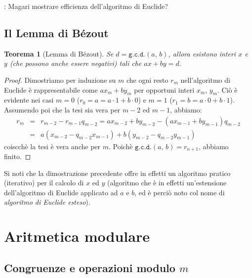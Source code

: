 \documentclass[pdflatex,11pt,a4paper,oneside]{article}
\newcommand{\XXX}[1][XXX]{\text{\bfseries{\color{red}{\emph{#1}}}}}
\newcommand{\TODO}[0]{\XXX[TODO]}
\newcommand{\p}[1]{\left({#1}\right)}
\newcommand{\gcdop}[0]{\ensuremath{\mathtt{g.c.d.}}}
\newcommand{\xgcd}[1]{\ensuremath{\gcdop\left({#1}\right)}}
\renewcommand{\gcd}[2]{\xgcd{{#1},\,{#2}}}
\newtheorem{theorem}[TheoremLike]{Teorema}
\begin{document}
\noindent
\TODO: Magari mostrare efficienza dell'algoritmo di Euclide?


\subsection{Il Lemma di B\'ezout}

\begin{theorem}[Lemma di B\'ezout]\label{thm:lemma-bezout}
Se $d = \gcd{a}{b}$, allora esistono interi $x$ e $y$ (che possono
anche essere negativi) tali che $ax + by = d$.
\end{theorem}
%
\begin{proof}
Dimostriamo per induzione su $m$ che ogni resto $r_m$ nell'algoritmo
di Euclide \`e rappresentabile come $ax_m + by_m$ per opportuni interi
$x_m$, $y_m$. Ci\`o \`e evidente nei casi $m = 0$ ($r_0 = a = a \cdot 1 +
b \cdot 0$) e $m = 1$ ($r_1 = b = a \cdot 0 + b \cdot 1$). Assumendo poi
che la tesi sia vera per $m - 2$ ed $m - 1$, abbiamo:
\begin{eqnarray*}
r_m & = & r_{m-2} - r_{m-1} q_{m-2} = ax_{m-2} + by_{m-2} -
                                      \p{ax_{m-1} + by_{m-1}} q_{m-2} \\
& = &
a\p{x_{m-2} - q_{m-2}x_{m-1}} + b\p{y_{m-2} - q_{m-2}y_{m-1}}
\end{eqnarray*}
coiscch\`e la tesi \`e vera anche per $m$.  Poich\`e $\gcd{a}{b} =
r_{n+1}$, abbiamo finito.
\end{proof}

Si noti che la dimostrazione precedente offre in effetti un algoritmo
pratico (iterativo) per il calcolo di  $x$ ed $y$ (algoritmo che \`e in
effetti un'estensione dell'algoritmo di Euclide applicato ad $a$ e $b$,
ed \`e perci\`o noto col nome di \emph{algoritmo di Euclide esteso}).


\section{Aritmetica modulare}


\subsection{Congruenze e operazioni modulo $m$}
\end{document}
